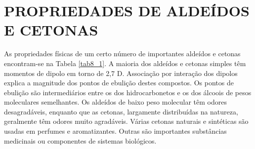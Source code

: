\section{PROPRIEDADES DE ALDEÍDOS E CETONAS}

As propriedades físicas de um certo número de importantes aldeídos e cetonas encontram-se na Tabela \ref{tab8_1}. A maioria dos aldeídos e cetonas simples têm momentos de dipolo em torno de 2,7 D. Associação por interação dos dipolos explica a magnitude dos pontos de ebulição destes compostos. Os pontos de ebulição são intermediários entre os dos hidrocarbonetos e os dos álcoois de pesos moleculares semelhantes. Os aldeídos de baixo peso molecular têm odores desagradáveis, enquanto que as cetonas, largamente distribuídas na natureza, geralmente têm odores muito agradáveis. Várias cetonas naturais e sintéticas são usadas em perfumes e aromatizantes. Outras são importantes substâncias medicinais ou componentes de sistemas biológicos. 

